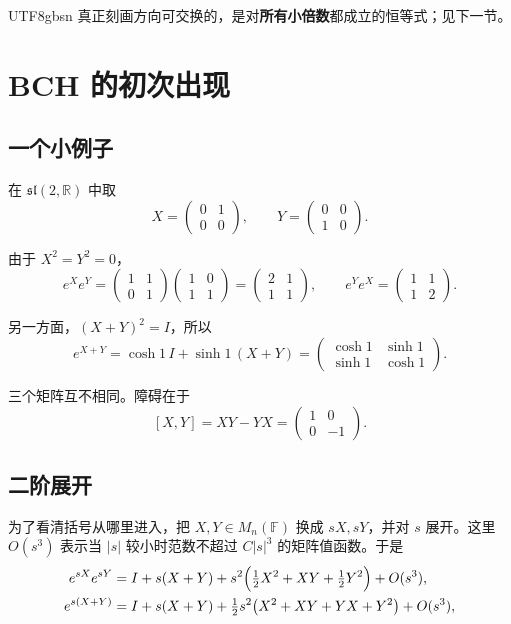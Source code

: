 \documentclass[11pt]{article}
\begin{document}
\begin{CJK*}{UTF8}{gbsn}
真正刻画方向可交换的，是对\textbf{所有小倍数}都成立的恒等式；见下一节。

\section{BCH 的初次出现}

\subsection{一个小例子}

在 $\mathfrak{sl}(2, \mathbb{R})$ 中取
\[
X = \begin{pmatrix} 0 & 1 \\ 0 & 0 \end{pmatrix}, \qquad Y = \begin{pmatrix} 0 & 0 \\ 1 & 0 \end{pmatrix}.
\]

由于 $X^2 = Y^2 = 0$，
\[
e^X e^Y = \begin{pmatrix} 1 & 1 \\ 0 & 1 \end{pmatrix} \begin{pmatrix} 1 & 0 \\ 1 & 1 \end{pmatrix} = \begin{pmatrix} 2 & 1 \\ 1 & 1 \end{pmatrix},
\qquad
e^Y e^X = \begin{pmatrix} 1 & 1 \\ 1 & 2 \end{pmatrix}.
\]

另一方面，$(X + Y)^2 = I$，所以
\[
e^{X+Y} = \cosh 1\, I + \sinh 1\, (X + Y) = \begin{pmatrix} \cosh 1 & \sinh 1 \\ \sinh 1 & \cosh 1 \end{pmatrix}.
\]

三个矩阵互不相同。障碍在于
\[
[X, Y] = XY - YX = \begin{pmatrix} 1 & 0 \\ 0 & -1 \end{pmatrix}.
\]

\subsection{二阶展开}

为了看清括号从哪里进入，把 $X, Y \in M_n(\mathbb{F})$ 换成 $sX, sY$，并对 $s$ 展开。这里 $O(s^3)$ 表示当 $|s|$ 较小时范数不超过 $C|s|^3$ 的矩阵值函数。于是
\[
\begin{aligned}
e^{sX} e^{sY} &= I + s(X + Y) + s^2\Bigl(\tfrac12 X^2 + XY + \tfrac12 Y^2\Bigr) + O(s^3), \\
e^{s(X+Y)} &= I + s(X + Y) + \tfrac12 s^2 \bigl(X^2 + XY + YX + Y^2\bigr) + O(s^3),
\end{aligned}
\]


\end{CJK*}
\end{document}
